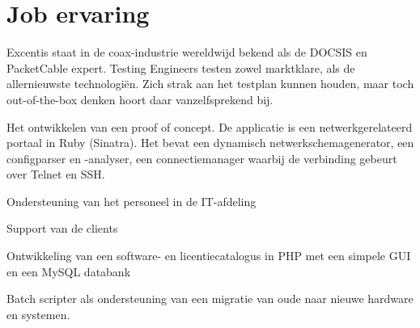 \documentclass[a4paper]{deedy-resume} %
\begin{document}
\begin{minipage}[t]{0.60\textwidth} %


\section{Job ervaring}


\vspace{\topsep} %
\begin{tightitemize}
\item Excentis staat in de coax-industrie wereldwijd bekend als de DOCSIS en PacketCable expert. Testing Engineers testen zowel marktklare, als de allernieuwste technologiën. Zich strak aan het testplan kunnen houden, maar toch out-of-the-box denken hoort daar vanzelfsprekend bij.
\end{tightitemize}

\sectionspace %



\vspace{\topsep} %
\begin{tightitemize}
\item Het ontwikkelen van een proof of concept. De applicatie is een netwerkgerelateerd portaal in Ruby (Sinatra). Het bevat een dynamisch netwerkschemagenerator, een configparser en -analyser, een connectiemanager waarbij de verbinding gebeurt over Telnet en SSH.
\end{tightitemize}

\sectionspace %



\begin{tightitemize}
\item Ondersteuning van het personeel in de IT-afdeling
\item Support van de clients
\item Ontwikkeling van een software- en licentiecatalogus in PHP met een simpele GUI en een MySQL databank
\item Batch scripter als ondersteuning van een migratie van oude naar nieuwe hardware en systemen.
\end{tightitemize}


\end{minipage}
\end{document}
